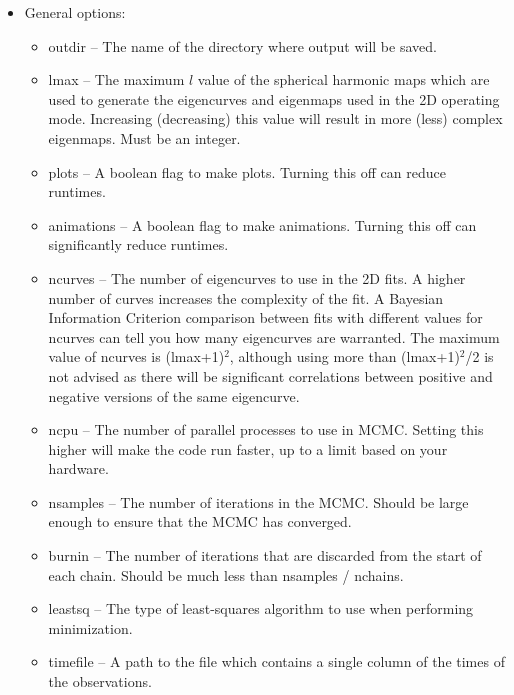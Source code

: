 \documentclass[12pt]{article}
\begin{document}
\begin{itemize}
\item General options:
  \begin{itemize}
  \item outdir -- The name of the directory where output will be saved. 
    
  \item lmax -- The maximum $l$ value of the spherical harmonic maps
    which are used to generate the eigencurves and eigenmaps used in
    the 2D operating mode. Increasing (decreasing) this value will
    result in more (less) complex eigenmaps. Must be an integer.

  \item plots -- A boolean flag to make plots. Turning this off can
    reduce runtimes.

  \item animations -- A boolean flag to make animations. Turning this off
    can significantly reduce runtimes.

  \item ncurves -- The number of eigencurves to use in the 2D fits. A
    higher number of curves increases the complexity of the fit. A
    Bayesian Information Criterion comparison between fits with
    different values for ncurves can tell you how many eigencurves are
    warranted. The maximum value of ncurves is (lmax+1)$^2$, although
    using more than (lmax+1)$^2$/2 is not advised as there will be
    significant correlations between positive and negative versions of
    the same eigencurve.

  \item ncpu -- The number of parallel processes to use in MCMC. Setting
    this higher will make the code run faster, up to a limit based on your
    hardware.

  \item nsamples -- The number of iterations in the MCMC. Should be
    large enough to ensure that the MCMC has converged.

  \item burnin -- The number of iterations that are discarded from the
    start of each chain. Should be much less than nsamples / nchains.

  \item leastsq -- The type of least-squares algorithm to use when
    performing minimization.

  \item timefile -- A path to the file which contains a single column of
    the times of the observations.


\end{itemize}
\end{itemize}
\end{document}
